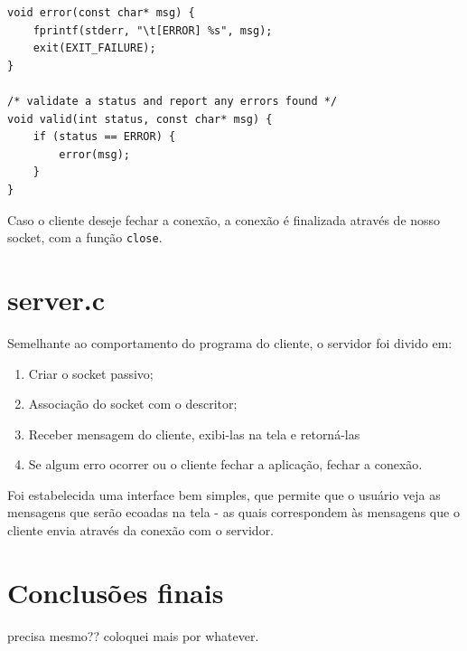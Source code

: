 \documentclass[10pt,twocolumn,letterpaper]{article}
\begin{document}
    \begin{lstlisting}[caption={API com verificação de erros, 
        utilizada tanto no cliente quanto servidor}, label=Algorithm]
void error(const char* msg) {
    fprintf(stderr, "\t[ERROR] %s", msg);
    exit(EXIT_FAILURE);
}

/* validate a status and report any errors found */
void valid(int status, const char* msg) {
    if (status == ERROR) {
        error(msg);
    }
}
    \end{lstlisting}

    Caso o cliente deseje fechar a conexão, a conexão é finalizada através de nosso socket,
com a função \texttt{close}.

\section{server.c}
Semelhante ao comportamento do programa do cliente, o servidor foi divido em:

\begin{enumerate}
    \item Criar o socket passivo;
    \item Associação do socket com o descritor;
    \item Receber mensagem do cliente, exibi-las na tela e retorná-las
    \item Se algum erro ocorrer ou o cliente fechar a aplicação, fechar a conexão.
\end{enumerate}

    Foi estabelecida uma interface bem simples, que permite que o usuário veja as
    mensagens que serão ecoadas na tela - as quais correspondem às mensagens que
    o cliente envia através da conexão com o servidor.

\section{Conclusões finais}

precisa mesmo?? coloquei mais por whatever.

{\small


}
\end{document}
